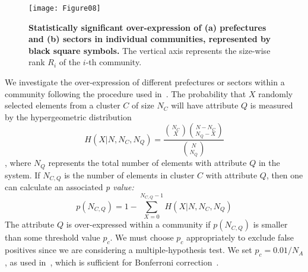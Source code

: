\documentclass[pre,floatfix,twocolumn,showpacs,a4paper,nofootinbib]{revtex4}
\begin{document}
\begin{figure}[t]
\begin{center}
\texttt{[image: Figure08]}
\end{center}
\caption{
{\bf Statistically significant over-expression of (a) prefectures and (b) sectors in individual communities, represented by black square symbols.}
The vertical axis represents the size-wise rank $R_i$ of the $i$-th community.}
\label{fig8}
\end{figure}
We investigate the over-expression of different prefectures or sectors within a community following the procedure used in~\cite{tumminello2011community}.
The probability that $X$ randomly selected elements from a cluster $C$ of size $N_C$ will have attribute $Q$ is measured by the hypergeometric distribution
$$H(X|N, N_C, N_Q)= \frac{\binom{N_C}{X}\binom{N-N_C}{N_Q-X}}{\binom{N}{N_Q}}$$,
where $N_Q$ represents the total number of elements with attribute $Q$ in the system.
If $N_{C,Q}$ is the number of elements in cluster $C$ with attribute $Q$, then one can calculate an associated 
{\em p value:} $$p(N_{C,Q}) = 1- \sum_{X=0}^{N_{C,Q}-1}H(X|N, N_C, N_Q)$$ 
The attribute $Q$ is over-expressed within a community if $p(N_{C,Q})$ is smaller than some threshold value $p_c$.
We must choose $p_c$ appropriately to exclude false positives since we are considering a multiple-hypothesis test.
We set $p_c=0.01/N_A$, as used in~\cite{tumminello2011community}, which is sufficient for Bonferroni correction~\cite{miller1981normal}.  
\end{document}
